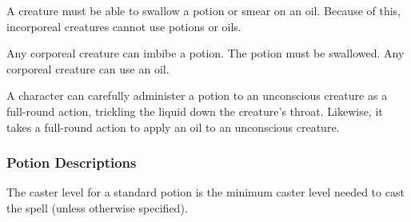 A creature must be able to swallow a potion or smear on an oil. Because of this, incorporeal creatures cannot use potions or oils.

Any corporeal creature can imbibe a potion. The potion must be swallowed. Any corporeal creature can use an oil.

A character can carefully administer a potion to an unconscious creature as a full-round action, trickling the liquid down the creature's throat. Likewise, it takes a full-round action to apply an oil to an unconscious creature.

\subsubsection{Potion Descriptions}
The caster level for a standard potion is the minimum caster level needed to cast the spell (unless otherwise specified).

